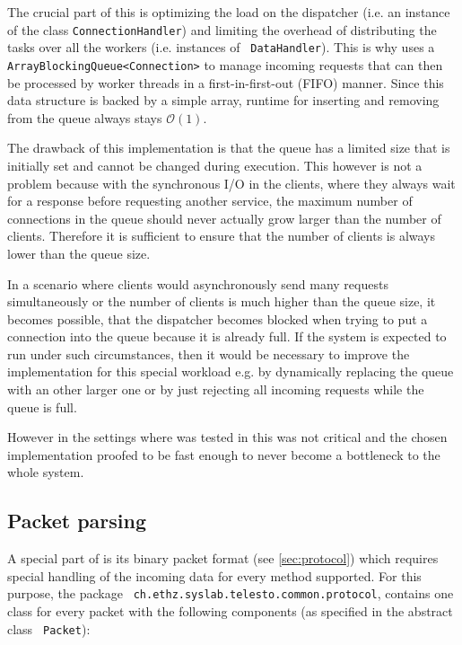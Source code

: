 \documentclass[a4paper, oneside]{csthesis}
\begin{document}
    The crucial part of this is optimizing the load on the dispatcher (i.e. an
    instance of the class {\tt ConnectionHandler}) and limiting the overhead of
    distributing the tasks over all the workers (i.e. instances of {\tt
    DataHandler}).
    This is why \telesto{} uses a {\tt ArrayBlockingQueue<Connection>} to manage incoming requests that can then be
    processed by worker threads in a first-in-first-out (FIFO) manner. Since
    this data structure is backed by a simple array, runtime for inserting and
    removing from the queue always stays $\mathcal{O}(1)$.
    
    The drawback of this implementation is that the queue has a limited size
    that is initially set and cannot be changed during execution.
    This however is not a problem because with the synchronous I/O in the
    clients, where they always wait for a response before requesting another
    service, the maximum number of connections in the queue should never
    actually grow larger than the number of clients. Therefore it is sufficient
    to ensure that the number of clients is always lower than the queue size.
    
    In a scenario where clients would asynchronously send many requests
    simultaneously or the number of clients is much higher than the queue size,
    it becomes possible, that the dispatcher becomes blocked when trying to put
    a connection into the queue because it is already full. If the system is
    expected to run under such circumstances, then it would be necessary to
    improve the implementation for this special workload e.g. by dynamically
    replacing the queue with an other larger one or by just rejecting all
    incoming requests while the queue is full.
    
    However in the settings where \telesto{} was tested in this was not critical
    and the chosen implementation proofed to be fast enough to never become a
    bottleneck to the whole system.
    
    
\subsection{Packet parsing}
    A special part of \telesto{} is its binary packet format (see
    \cref{sec:protocol}) which requires special handling of the incoming data
    for every method supported. For this purpose, the package {\tt
    ch.ethz.syslab.telesto.common.protocol}, contains one class for every packet
    with the following components (as specified in the abstract class {\tt
    Packet}):
    
\end{document}
